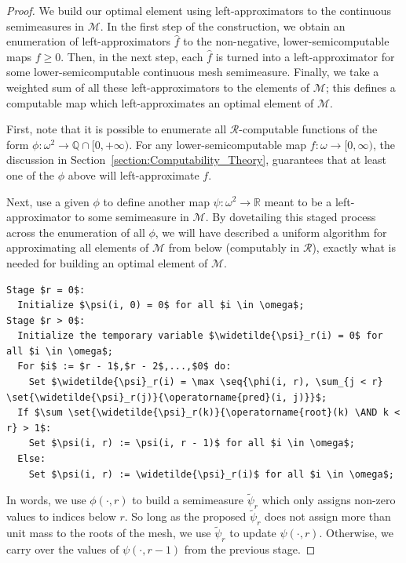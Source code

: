 \begin{proof}

    We build our optimal element using left-approximators to the continuous semimeasures in $\mathcal{M}$. In the first step of the construction, we obtain an enumeration of left-approximators $\widehat{f}$ to the non-negative, lower-semicomputable maps $f \geq 0$. Then, in the next step, each $\widehat{f}$ is turned into a left-approximator for some lower-semicomputable continuous mesh semimeasure. Finally, we take a weighted sum of all these left-approximators to the elements of $\mathcal{M}$; this defines a computable map which left-approximates an optimal element of $\mathcal{M}$.

    First, note that it is possible to enumerate all $\mathscr{R}$-computable functions of the form $\phi : \omega^2 \to \mathbb{Q} \cap [0, +\infty)$. For any lower-semicomputable map $f: \omega \to [0, \infty)$, the discussion in Section~\ref{section:Computability_Theory}, guarantees that at least one of the $\phi$ above will left-approximate $f$.

    Next, use a given $\phi$ to define another map $\psi : \omega^2 \to \mathbb{R}$ meant to be a left-approximator to some semimeasure in $\mathcal{M}$. By dovetailing this staged process across the enumeration of all $\phi$, we will have described a uniform algorithm for approximating all elements of $\mathcal{M}$ from below (computably in $\mathscr{R}$), exactly what is needed for building an optimal element of $\mathcal{M}$.
    
    \begin{lstlisting}[mathescape=true]
Stage $r = 0$: 
  Initialize $\psi(i, 0) = 0$ for all $i \in \omega$;
Stage $r > 0$:
  Initialize the temporary variable $\widetilde{\psi}_r(i) = 0$ for all $i \in \omega$;
  For $i$ := $r - 1$,$r - 2$,...,$0$ do:
    Set $\widetilde{\psi}_r(i) = \max \seq{\phi(i, r), \sum_{j < r} \set{\widetilde{\psi}_r(j)}{\operatorname{pred}(i, j)}}$; 
  If $\sum \set{\widetilde{\psi}_r(k)}{\operatorname{root}(k) \AND k < r} > 1$:
    Set $\psi(i, r) := \psi(i, r - 1)$ for all $i \in \omega$;
  Else: 
    Set $\psi(i, r) := \widetilde{\psi}_r(i)$ for all $i \in \omega$;
    \end{lstlisting}
    In words, we use $\phi(\cdot, r)$ to build a semimeasure $\widetilde{\psi}_r$ which only assigns non-zero values to indices below $r$. So long as the proposed $\widetilde{\psi}_r$ does not assign more than unit mass to the roots of the mesh, we use $\widetilde{\psi}_r$ to update $\psi(\cdot, r)$. Otherwise, we carry over the values of $\psi(\cdot, r - 1)$ from the previous stage.


\end{proof}
